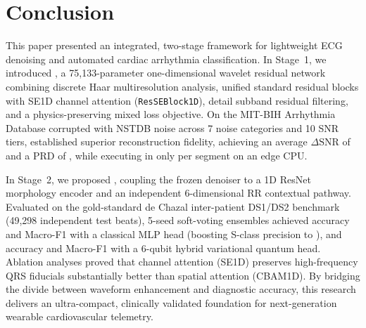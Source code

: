 \section{Conclusion}
\label{sec:conclusion}

This paper presented an integrated, two-stage framework for lightweight ECG denoising and automated cardiac arrhythmia classification. In Stage~1, we introduced \HSL, a 75{,}133-parameter one-dimensional wavelet residual network combining discrete Haar multiresolution analysis, unified standard residual blocks with SE1D channel attention (\texttt{ResSEBlock1D}), detail subband residual filtering, and a physics-preserving mixed loss objective. On the MIT-BIH Arrhythmia Database corrupted with NSTDB noise across 7 noise categories and 10 SNR tiers, \HSL{} established superior reconstruction fidelity, achieving an average $\Delta\mathrm{SNR}$ of  and a $\mathrm{PRD}$ of , while executing in only  per segment on an edge CPU.

In Stage~2, we proposed \RRN, coupling the frozen denoiser to a 1D ResNet morphology encoder and an independent 6-dimensional RR contextual pathway. Evaluated on the gold-standard de Chazal inter-patient DS1/DS2 benchmark (49{,}298 independent test beats), 5-seed soft-voting ensembles achieved  accuracy and  Macro-F1 with a classical MLP head (boosting S-class precision to ), and  accuracy and  Macro-F1 with a 6-qubit hybrid variational quantum head. Ablation analyses proved that channel attention (SE1D) preserves high-frequency QRS fiducials substantially better than spatial attention (CBAM1D). By bridging the divide between waveform enhancement and diagnostic accuracy, this research delivers an ultra-compact, clinically validated foundation for next-generation wearable cardiovascular telemetry.
